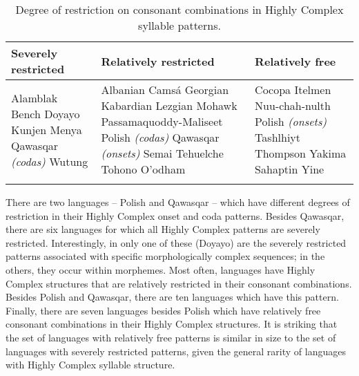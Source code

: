 \begin{table}
\begin{tabularx}{\textwidth}{QQQ}
\lsptoprule
{Severely restricted} & {Relatively restricted}  & {Relatively free}\\\midrule
Alamblak\newline
Bench\newline
Doyayo\newline
Kunjen\newline
Menya\newline
Qawasqar \textit{(codas)}\newline
Wutung \newline
& Albanian\newline
Camsá\newline
Georgian\newline
Kabardian\newline
Lezgian\newline
Mohawk\newline
Passamaquoddy-Maliseet\newline
Polish \textit{(codas)}\newline
Qawasqar \textit{(onsets)}\newline
Semai\newline
Tehuelche\newline
Tohono O’odham
& Cocopa\newline
Itelmen\newline
Nuu-chah-nulth\newline
Polish \textit{(onsets)}\newline
Tashlhiyt\newline
Thompson\newline
Yakima Sahaptin\newline
Yine\\
\lspbottomrule
\end{tabularx}
\caption{\label{tab:3.13}Degree of restriction on consonant combinations in Highly Complex syllable patterns.}
\end{table}

  There are two languages -- Polish and Qawasqar -- which have different degrees of restriction in their Highly Complex onset and coda patterns. Besides Qawasqar, there are six languages for which all Highly Complex patterns are severely restricted. Interestingly, in only one of these (Doyayo) are the severely restricted patterns associated with specific morphologically complex sequences; in the others, they occur within morphemes. Most often, languages have Highly Complex structures that are relatively restricted in their consonant combinations. Besides Polish and Qawasqar, there are ten languages which have this pattern. Finally, there are seven languages besides Polish which have relatively free consonant combinations in their Highly Complex structures. It is striking that the set of languages with relatively free patterns is similar in size to the set of languages with severely restricted patterns, given the general rarity of languages with Highly Complex syllable structure.


